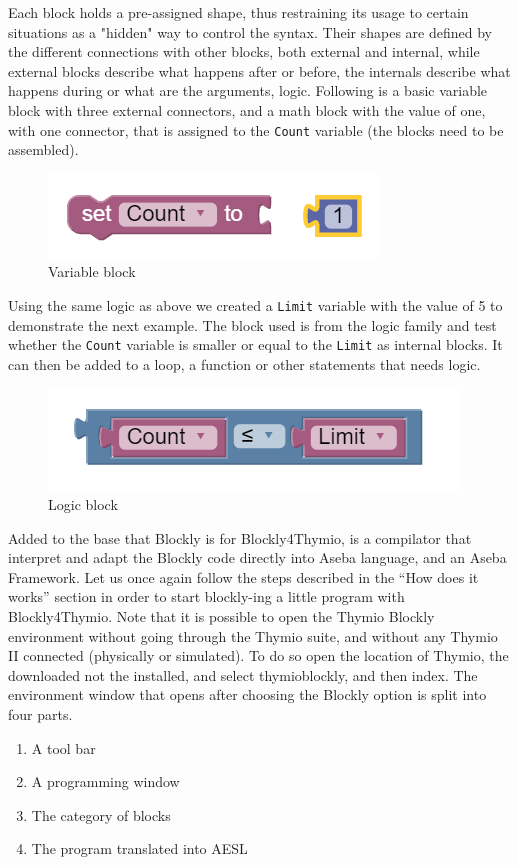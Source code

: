 \documentclass{scrartcl}
\begin{document}
Each block holds a pre-assigned shape, thus restraining its usage to certain situations as a "hidden" way to control the syntax. Their shapes are defined by the different connections with other blocks, 
both external and internal, while external blocks describe what happens after or before, the internals describe what happens during or what are the arguments, logic. 
Following is a basic variable block with three external connectors, and a math block with the value of one, with one connector, that is assigned to the \texttt{Count} variable (the blocks need to be assembled). \\
\begin{figure}
  \centering
  \includegraphics[scale=0.5]{./Blockly/basic_variable}
  \caption{Variable block}
  \label{fig:thymio_blockly_variable_block}
\end{figure}

Using the same logic as above we created a \texttt{Limit} variable with the value of 5 to demonstrate the next example. 
The block used is from the logic family and test whether the \texttt{Count} variable is smaller or equal to the \texttt{Limit} as internal blocks. 
It can then be added to a loop, a function or other statements that needs logic.\\
\begin{figure}
  \centering
  \includegraphics[scale=0.5]{./Blockly/basic_logic}
  \caption{Logic block}
  \label{fig:thymio_blockly_logic_block}
\end{figure}

Added to the base that Blockly is for Blockly4Thymio, is a compilator that interpret and adapt the Blockly code directly into Aseba language, and an Aseba Framework. 
Let us once again follow the steps described in the “How does it works” section in order to start blockly-ing a little program with Blockly4Thymio. 
Note that it is possible to open the Thymio Blockly environment without going through the Thymio suite, and without any Thymio II connected (physically or simulated). 
To do so open the location of Thymio, the downloaded not the installed, and select thymio\textunderscore blockly, and then index.
The environment window that opens after choosing the Blockly option is split into four parts.
\begin{enumerate}
  \item A tool bar
  \item A programming window
  \item The category of blocks
  \item The program translated into AESL
\end{enumerate}
\end{document}
